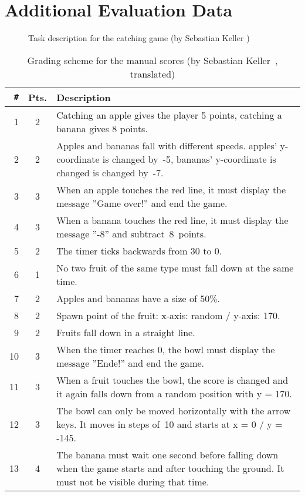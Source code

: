 \chapter{Additional Evaluation Data}
\label{cha:additional_evaluation_data}

\begin{figure}[htpb]
    \centering
    \caption{Task description for the catching game (by Sebastian Keller \cite{keller})}
    \label{fig:catching_game_task_description}
\end{figure}

\begin{table}[htpb]
    \centering
    \footnotesize
    \begin{tabular}{rcp{}}
        \toprule
        \texttt{\#} & Pts. & Description \\
        \midrule
         1 & 2 & Catching an apple gives the player 5 points, catching a banana gives 8 points. \\
         2 & 2 & Apples and bananas fall with different speeds. apples' y-coordinate is changed by~-5, bananas' y-coordinate is changed is changed by~-7. \\
         3 & 3 & When an apple touches the red line, it must display the message ''Game over!'' and end the game. \\
         4 & 3 & When a banana touches the red line, it must display the message ''-8'' and subtract~8~points. \\
         5 & 2 & The timer ticks backwards from 30 to 0. \\
         6 & 1 & No two fruit of the same type must fall down at the same time. \\
         7 & 2 & Apples and bananas have a size of 50\%. \\
         8 & 2 & Spawn point of the fruit: x-axis: random / y-axis: 170. \\
         9 & 2 & Fruits fall down in a straight line. \\
        10 & 3 & When the timer reaches 0, the bowl must display the message ''Ende!'' and end the game. \\
        11 & 3 & When a fruit touches the bowl, the score is changed and it again falls down from a random position with y = 170. \\
        12 & 3 & The bowl can only be moved horizontally with the arrow keys. It moves in steps of~10 and starts at x = 0 / y = -145. \\
        13 & 4 & The banana must wait one second before falling down when the game starts and after touching the ground. It must not be visible during that time. \\
        \bottomrule
    \end{tabular}
    \caption{Grading scheme for the manual scores (by Sebastian Keller~\cite{keller}, translated)}
    \label{tab:manual_grading_scheme}
\end{table}

